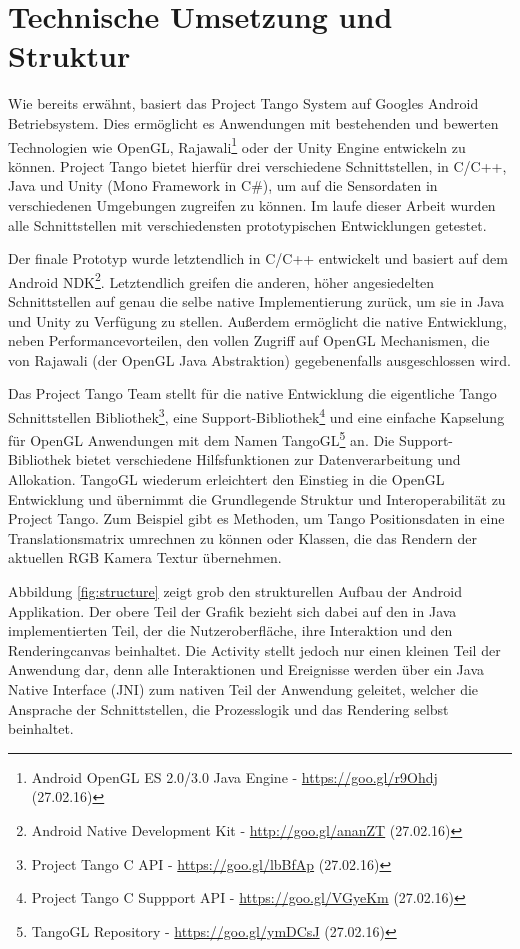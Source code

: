 \section{Technische Umsetzung und Struktur} \label{eq:technic}

Wie bereits erwähnt, basiert das Project Tango System auf Googles Android Betriebsystem. Dies ermöglicht es Anwendungen mit bestehenden und bewerten Technologien wie OpenGL, Rajawali\footnote{Android OpenGL ES 2.0/3.0 Java Engine - \url{https://goo.gl/r9Ohdj} (27.02.16)} oder der Unity Engine entwickeln zu können. Project Tango bietet hierfür drei verschiedene Schnittstellen, in C/C++, Java und Unity (Mono Framework in C\#), um auf die Sensordaten in verschiedenen Umgebungen zugreifen zu können. Im laufe dieser Arbeit wurden alle Schnittstellen mit verschiedensten prototypischen Entwicklungen getestet.

Der finale Prototyp wurde letztendlich in C/C++ entwickelt und basiert auf dem Android NDK\footnote{Android Native Development Kit - \url{http://goo.gl/ananZT} (27.02.16)}. Letztendlich greifen die anderen, höher angesiedelten Schnittstellen auf genau die selbe native Implementierung zurück, um sie in Java und Unity zu Verfügung zu stellen. Außerdem ermöglicht die native Entwicklung, neben Performancevorteilen, den vollen Zugriff auf OpenGL Mechanismen, die von Rajawali (der OpenGL Java Abstraktion) gegebenenfalls ausgeschlossen wird. 

Das Project Tango Team stellt für die native Entwicklung die eigentliche Tango Schnittstellen Bibliothek\footnote{Project Tango C API - \url{https://goo.gl/lbBfAp} (27.02.16)}, eine Support-Bibliothek\footnote{Project Tango C Suppport API - \url{https://goo.gl/VGyeKm} (27.02.16)} und eine einfache Kapselung für OpenGL Anwendungen mit dem Namen TangoGL\footnote{TangoGL Repository - \url{https://goo.gl/ymDCsJ} (27.02.16)} an. Die Support-Bibliothek bietet verschiedene Hilfsfunktionen zur Datenverarbeitung und Allokation. TangoGL wiederum erleichtert den Einstieg in die OpenGL Entwicklung und übernimmt die Grundlegende Struktur und Interoperabilität zu Project Tango. Zum Beispiel gibt es Methoden, um Tango Positionsdaten in eine Translationsmatrix umrechnen zu können oder Klassen, die das Rendern der aktuellen RGB Kamera Textur übernehmen. 

Abbildung \ref{fig:structure} zeigt grob den strukturellen Aufbau der Android Applikation. Der obere Teil der Grafik bezieht sich dabei auf den in Java implementierten Teil, der die Nutzeroberfläche, ihre Interaktion und den Renderingcanvas beinhaltet. Die Activity stellt jedoch nur einen kleinen Teil der Anwendung dar, denn alle Interaktionen und Ereignisse werden über ein Java Native Interface (JNI) zum nativen Teil der Anwendung geleitet, welcher die Ansprache der Schnittstellen, die Prozesslogik und das Rendering selbst beinhaltet. 

